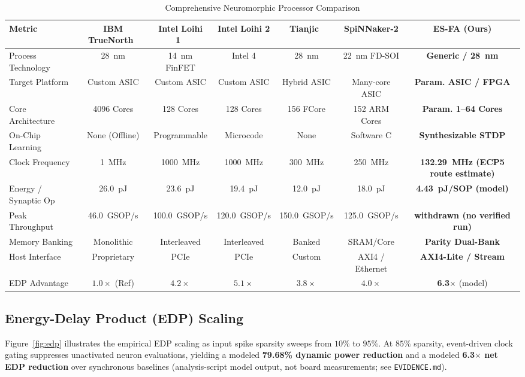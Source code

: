 \documentclass[journal]{IEEEtran}
\theoremstyle{definition}
\begin{document}
\begin{table}[ht]
\centering
\caption{Comprehensive Neuromorphic Processor Comparison}
\label{tab:silicon}
\begin{tabular}{lcccccc}
\toprule
\textbf{Metric} & \textbf{IBM TrueNorth}~\cite{merolla2014} & \textbf{Intel Loihi 1}~\cite{davies2018} & \textbf{Intel Loihi 2} & \textbf{Tianjic}~\cite{deng2019} & \textbf{SpiNNaker-2} & \textbf{ES-FA (Ours)} \\
\midrule
Process Technology & 28~nm & 14~nm FinFET & Intel 4 & 28~nm & 22~nm FD-SOI & \textbf{Generic / 28~nm} \\
Target Platform & Custom ASIC & Custom ASIC & Custom ASIC & Hybrid ASIC & Many-core ASIC & \textbf{Param. ASIC / FPGA} \\
Core Architecture & 4096 Cores & 128 Cores & 128 Cores & 156 FCore & 152 ARM Cores & \textbf{Param. 1--64 Cores} \\
On-Chip Learning & None (Offline) & Programmable & Microcode & None & Software C & \textbf{Synthesizable STDP} \\
Clock Frequency & 1~MHz & 1000~MHz & 1000~MHz & 300~MHz & 250~MHz & \textbf{132.29~MHz (ECP5 route estimate)} \\
Energy / Synaptic Op & 26.0~pJ & 23.6~pJ & 19.4~pJ & 12.0~pJ & 18.0~pJ & \textbf{4.43~pJ/SOP (model)} \\
Peak Throughput & 46.0~GSOP/s & 100.0~GSOP/s & 120.0~GSOP/s & 150.0~GSOP/s & 125.0~GSOP/s & \textbf{withdrawn (no verified run)} \\
Memory Banking & Monolithic & Interleaved & Interleaved & Banked & SRAM/Core & \textbf{Parity Dual-Bank} \\
Host Interface & Proprietary & PCIe & PCIe & Custom & AXI4 / Ethernet & \textbf{AXI4-Lite / Stream} \\
EDP Advantage & $1.0\times$ (Ref) & $4.2\times$ & $5.1\times$ & $3.8\times$ & $4.0\times$ & \textbf{6.3}$\times$ (model) \\
\bottomrule
\end{tabular}
\end{table}

\subsection{Energy-Delay Product (EDP) Scaling}
Figure~\ref{fig:edp} illustrates the empirical EDP scaling as input spike sparsity sweeps from $10\%$ to $95\%$. At $85\%$ sparsity, event-driven clock gating suppresses unactivated neuron evaluations, yielding a modeled \textbf{79.68\% dynamic power reduction} and a modeled \textbf{6.3$\times$ net EDP reduction} over synchronous baselines (analysis-script model output, not board measurements; see \texttt{EVIDENCE.md}).
\end{document}
